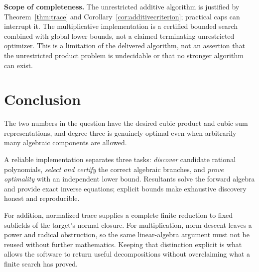 \documentclass[11pt,a4paper]{article}
\theoremstyle{definition}
\theoremstyle{remark}
\begin{document}
\textbf{Scope of completeness.} The unrestricted additive algorithm is justified by Theorem~\ref{thm:trace} and Corollary~\ref{cor:additivecriterion}; practical caps can interrupt it. The multiplicative implementation is a certified bounded search combined with global lower bounds, not a claimed terminating unrestricted optimizer. This is a limitation of the delivered algorithm, not an assertion that the unrestricted product problem is undecidable or that no stronger algorithm can exist.

\section{Conclusion}
The two numbers in the question have the desired cubic product and cubic sum representations, and degree three is genuinely optimal even when arbitrarily many algebraic components are allowed.

A reliable implementation separates three tasks: \emph{discover} candidate rational polynomials, \emph{select and certify} the correct algebraic branches, and \emph{prove optimality} with an independent lower bound. Resultants solve the forward algebra and provide exact inverse equations; explicit bounds make exhaustive discovery honest and reproducible.

For addition, normalized trace supplies a complete finite reduction to fixed subfields of the target's normal closure. For multiplication, norm descent leaves a power and radical obstruction, so the same linear-algebra argument must not be reused without further mathematics. Keeping that distinction explicit is what allows the software to return useful decompositions without overclaiming what a finite search has proved.

\appendix
\end{document}
